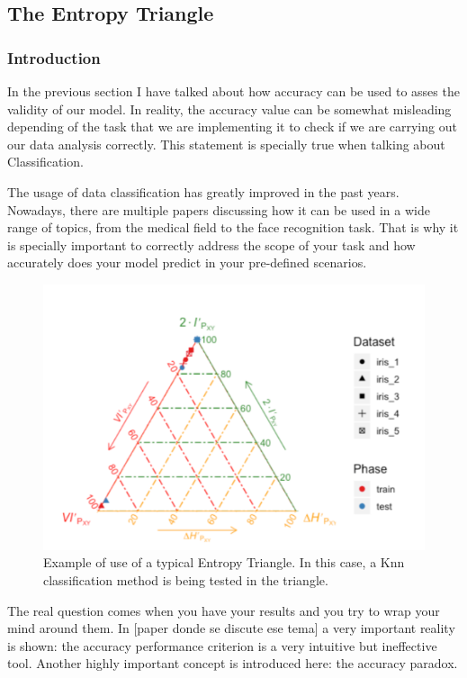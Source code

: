 \documentclass[12pt]{report}
\begin{document}
\subsection{The Entropy Triangle}
\subsubsection{Introduction}

In the previous section I have talked about how accuracy can be used to asses the validity of our model. In reality, the accuracy value can be somewhat misleading depending of the task that we are implementing it to check if we are carrying out our data analysis correctly. This statement is specially true when talking about Classification.\par

The usage of data classification has greatly improved in the past years. Nowadays, there are multiple papers discussing how it can be used in a wide range of topics, from the medical field to the face recognition task. That is why it is specially important to correctly address the scope of your task and how accurately does your model predict in your pre-defined scenarios.\par

\begin{figure}[H]
	\centering
	\includegraphics[width=15cm]{Figuras_tfg/Example_ET}
	\caption{Example of use of a typical Entropy Triangle. In this case, a Knn classification method is being tested in the triangle.}
	\label{fig:figure_example_et}
\end{figure} 

The real question comes when you have your results and you try to wrap your mind around them. In [paper donde se discute ese tema] a very important reality is shown: the accuracy performance criterion is a very intuitive but ineffective tool. Another highly important concept is introduced here: the accuracy paradox.\par  
\end{document}
